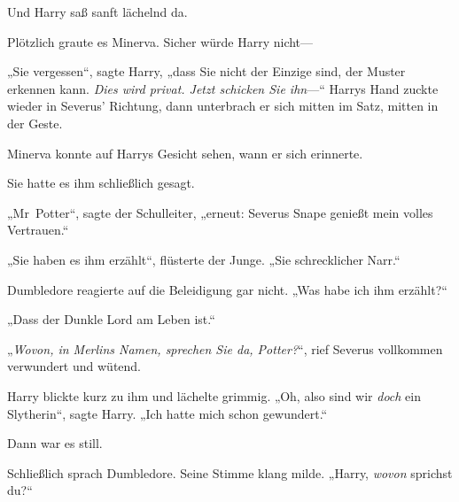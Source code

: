 Und Harry saß sanft lächelnd da.

Plötzlich graute es Minerva. Sicher würde Harry nicht—

„Sie vergessen“, sagte Harry, „dass Sie nicht der Einzige sind, der Muster erkennen kann. \emph{Dies wird privat. Jetzt schicken Sie ihn}—“ Harrys Hand zuckte wieder in Severus’ Richtung, dann unterbrach er sich mitten im Satz, mitten in der Geste.

Minerva konnte auf Harrys Gesicht sehen, wann er sich erinnerte.

Sie hatte es ihm schließlich gesagt.

„Mr~Potter“, sagte der Schulleiter, „erneut: Severus Snape genießt mein volles Vertrauen.“

„Sie haben es ihm erzählt“, flüsterte der Junge. „Sie schrecklicher Narr.“

Dumbledore reagierte auf die Beleidigung gar nicht. „Was habe ich ihm erzählt?“

„Dass der Dunkle Lord am Leben ist.“

„\emph{Wovon, in Merlins Namen, sprechen Sie da, Potter?}“, rief Severus vollkommen verwundert und wütend.

Harry blickte kurz zu ihm und lächelte grimmig. „Oh, also sind wir \emph{doch} ein Slytherin“, sagte Harry. „Ich hatte mich schon gewundert.“

Dann war es still.

Schließlich sprach Dumbledore. Seine Stimme klang milde. „Harry, \emph{wovon} sprichst du?“

